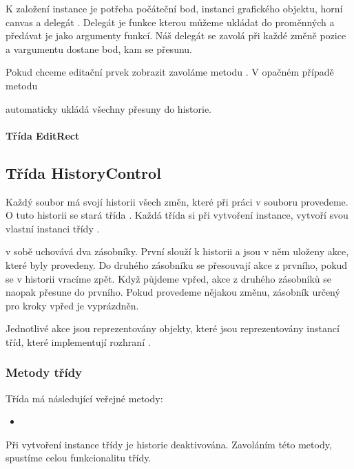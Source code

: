 \documentclass[
  field=inf,
  biblatex,
  glossaries,
  index
]{kidiplom}
\begin{document}
K založení instance je potřeba počáteční bod, instanci grafického objektu, horní canvas a delegát . Delegát je funkce kterou můžeme ukládat do proměnných  a předávat je jako argumenty funkcí. Náš delegát se zavolá při každé změně pozice a vargumentu dostane bod, kam se přesunu.

Pokud chceme editační prvek zobrazit zavoláme metodu . V opačném případě metodu 

 automaticky ukládá všechny přesuny do historie.

\paragraph{Třída EditRect}


\subsection{Třída HistoryControl}

Každý soubor má svojí historii všech změn, které při práci v souboru provedeme. O tuto historii se stará třída . Každá třída  si při vytvoření instance, vytvoří svou vlastní instanci třídy .

 v sobě uchovává dva zásobníky. První slouží k historii a jsou v něm uloženy akce, které byly provedeny. Do druhého zásobníku se přesouvají akce z prvního, pokud se v historii vracíme zpět. Když půjdeme vpřed, akce z druhého zásobníků se naopak přesune do prvního. Pokud provedeme nějakou změnu, zásobník určený pro kroky vpřed je vyprázdněn.

Jednotlivé akce jsou reprezentovány objekty, které jsou reprezentovány instancí tříd, které implementují rozhraní .

\subsubsection{Metody třídy}

Třída  má následující veřejné metody:

\begin{itemize}
\item {}
\end{itemize}
Při vytvoření instance třídy  je historie deaktivována. Zavoláním této metody, spustíme celou funkcionalitu třídy.
\end{document}

